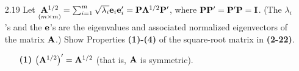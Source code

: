 \begin{enumerate}[font=\bfseries]
        \begin{lstlisting}
            function [] = MyPlotEllipse(V, D, c, fName)
    % Compute points corresponding to axis-oriented ellipse.
    % Where to center the ellipse.
    xc = 0;
    yc = 0;
    % The length in the major and minor axis.
    b = c/sqrt(D(1,1));
    a = c/sqrt(D(2,2));
    theta = acos(-V(:,1)'*[1 ; 0]); % acos(1/sqrt(3));
    
    t = linspace(0, 2*pi, 200);
    xt = b * cos(t) + xc;
    yt = a * sin(t) + yc;
    
    % Apply rotation by angle theta (in radians).
    cot = cos(theta); sit = sin(theta);
    x = xt * cot - yt * sit;
    y = xt * sit + yt * cot;

    hold on
        % Plot the ellipse.
        p=plot(x, y, '-', 'Color', 'blue');
        
        % Plot the vector for the major axis.
        quiver(0, 0, V(1,1), V(2,1), c, 'color', 'k');
        quiver(0, 0, -V(1,1), -V(2,1), c, 'color', 'k');
        
        % Plot the vector for the minor axis.
        quiver(0, 0, V(1,2), V(2,2), c, 'color', 'k');
        quiver(0, 0, -V(1,2), -V(2,2), c, 'color', 'k');
        
        % Plot red point for major axis.
        plot((c/sqrt(D(1,1)))*V(1,1), (c/sqrt(D(1,1)))*V(2,1), 'o', 'Color', 'red');
        plot(-(c/sqrt(D(1,1)))*V(1,1), -(c/sqrt(D(1,1)))*V(2,1), 'o', 'Color', 'red');
        
        % Plot green point for minor axis.
        plot((c/sqrt(D(2,2)))*V(1,2), (c/sqrt(D(2,2)))*V(2,2), 'o', 'Color', 'green');
        plot(-(c/sqrt(D(2,2)))*V(1,2), -(c/sqrt(D(2,2)))*V(2,2), 'o', 'Color', 'green');
        title(append('c^2 = ', num2str(c)))
        grid on
        pbaspect([1 1 1])
    hold off
    saved_file = append('.\applied-multivariate-statistics\solutions\chapter-2\', fName, '.png');
    saveas(p, saved_file, 'png')
end
        \end{lstlisting}
        \item[2.19] Let $\underset{\left(m \times m\right)}{\bold{A}^{1/2}} = \sum_{i=1}^m{\sqrt{\lambda_i} \bold{e}_i \bold{e}_i^\prime} = \bold{P}\bold{\Lambda}^{1/2}\bold{P}^\prime$, where $\bold{P}\bold{P}^\prime = \bold{P}^\prime\bold{P} = \bold{I}$. (The $\lambda_i$'s and the $\bold{e}$'s are the eigenvalues and associated normalized eigenvectors of the matrix $\bold{A}$.) Show Properties \textbf{(1)-(4)} of the square-root matrix in \textbf{(2-22)}.
        \begin{enumerate}
            \item[\textbf{(1)}]{${\left(\bold{A}^{1/2}\right)}^\prime = \bold{A}^{1/2}$ (that is, $\bold{A}$ is symmetric).}
            

\end{enumerate}
\end{enumerate}
